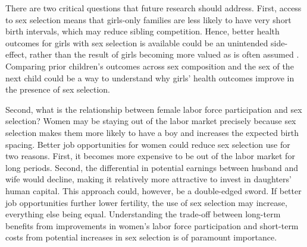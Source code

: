 \documentclass[12pt,letterpaper]{article}
\begin{document}

There are two critical questions that future research should address.
First, access to sex selection means that girls-only families are less likely to have
very short birth intervals, which may reduce sibling competition. 
Hence, better health outcomes for girls with sex selection is available could be an 
unintended side-effect, rather than the result of girls becoming more valued as is often 
assumed \citep{Hu2015}. 
Comparing prior children's outcomes across sex composition and the sex of the next child 
could be a way to understand why girls' health outcomes improve in the presence of sex selection.

Second, what is the relationship between female labor force participation and sex selection? 
Women may be staying out of the labor market precisely because sex selection makes 
them more likely to have a boy and increases the expected birth spacing. 
Better job opportunities for women could reduce sex selection use for two reasons. 
First, it becomes more expensive to be out of the labor market for long periods. 
Second, the differential in potential earnings between husband and wife would decline, 
making it relatively more attractive to invest in daughters' human capital.  
This approach could, however, be a double-edged sword. 
If better job opportunities further lower fertility, the use of sex selection may increase, 
everything else being equal.
Understanding the trade-off between long-term benefits from improvements in women's labor 
force participation and short-term costs from potential increases in sex selection is of 
paramount importance.





\clearpage

\onehalfspacing






\clearpage
\newpage

\appendix
\end{document}
